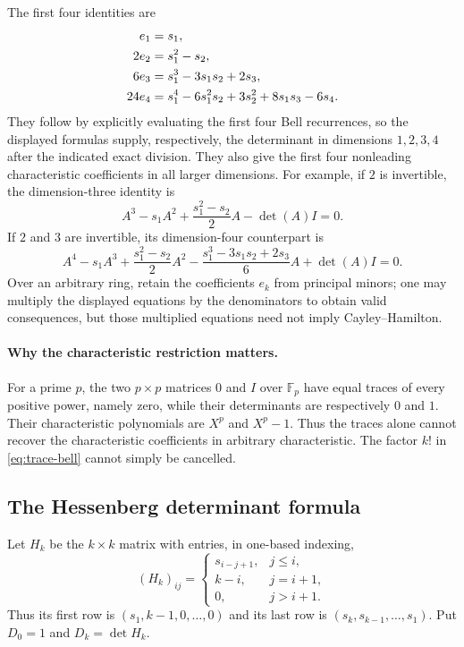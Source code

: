 The first four identities are
\begin{align}
 e_1&=s_1,\notag\\
 2e_2&=s_1^2-s_2,\notag\\
 6e_3&=s_1^3-3s_1s_2+2s_3,\label{eq:trace-lowdim}\\
 24e_4&=s_1^4-6s_1^2s_2+3s_2^2+8s_1s_3-6s_4.\notag
\end{align}
They follow by explicitly evaluating the first four Bell recurrences, so
the displayed formulas supply, respectively, the determinant in dimensions
$1,2,3,4$ after the indicated exact division.  They also give the first four
nonleading characteristic coefficients in all larger dimensions.  For
example, if $2$ is invertible, the dimension-three identity is
\[
 A^3-s_1A^2+\frac{s_1^2-s_2}{2}A-\det(A)I=0.
\]
If $2$ and $3$ are invertible, its dimension-four counterpart is
\[
 A^4-s_1A^3+\frac{s_1^2-s_2}{2}A^2
 -\frac{s_1^3-3s_1s_2+2s_3}{6}A+\det(A)I=0.
\]
Over an arbitrary ring, retain the coefficients $e_k$ from principal minors;
one may multiply the displayed equations by the denominators to obtain valid
consequences, but those multiplied equations need not imply Cayley--Hamilton.

\paragraph{Why the characteristic restriction matters.}
For a prime $p$, the two $p\times p$ matrices $0$ and $I$ over
$\mathbb F_p$ have equal traces of every positive power, namely zero, while
their determinants are respectively $0$ and $1$.  Their characteristic
polynomials are $X^p$ and $X^p-1$.  Thus the traces alone cannot recover the
characteristic coefficients in arbitrary characteristic.  The factor
$k!$ in \eqref{eq:trace-bell} cannot simply be cancelled.

\subsection{The Hessenberg determinant formula}

Let $H_k$ be the $k\times k$ matrix with entries, in one-based indexing,
\[
 (H_k)_{ij}=
 \begin{cases}
 s_{i-j+1},&j\leq i,\\
 k-i,&j=i+1,\\
 0,&j>i+1.
 \end{cases}
\]
Thus its first row is $(s_1,k-1,0,\ldots,0)$ and its last row is
$(s_k,s_{k-1},\ldots,s_1)$.  Put $D_0=1$ and $D_k=\det H_k$.

